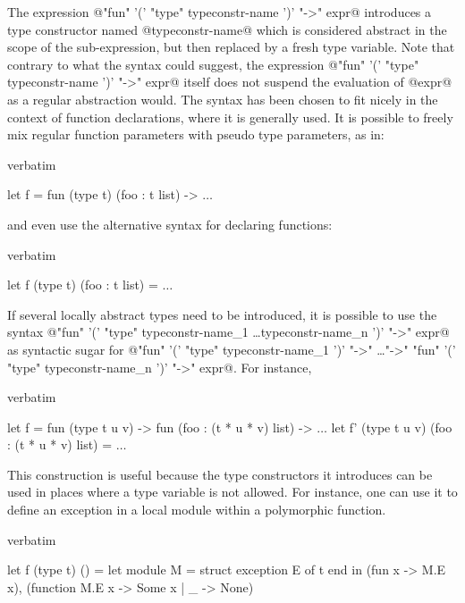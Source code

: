 The expression @"fun" '(' "type" typeconstr-name ')' "->" expr@ introduces a
type constructor named @typeconstr-name@ which is considered abstract
in the scope of the sub-expression, but then replaced by a fresh type
variable.  Note that contrary to what the syntax could suggest, the
expression @"fun" '(' "type" typeconstr-name ')' "->" expr@ itself does not
suspend the evaluation of @expr@ as a regular abstraction would.  The
syntax has been chosen to fit nicely in the context of function
declarations, where it is generally used. It is possible to freely mix
regular function parameters with pseudo type parameters, as in:
\begin{camlexample}{verbatim}
\begin{caml}
\begin{camlinput}
let f = fun (type t) (foo : t list) -> $\ldots$
\end{camlinput}
\end{caml}
\end{camlexample}
and even use the alternative syntax for declaring functions:
\begin{camlexample}{verbatim}
\begin{caml}
\begin{camlinput}
let f (type t) (foo : t list) = $\ldots$
\end{camlinput}
\end{caml}
\end{camlexample}
If several locally abstract types need to be introduced, it is possible to use
the syntax
@"fun" '(' "type" typeconstr-name_1 \ldots typeconstr-name_n ')' "->" expr@
as syntactic sugar for @"fun" '(' "type" typeconstr-name_1 ')' "->" \ldots "->"
"fun" '(' "type" typeconstr-name_n ')' "->" expr@. For instance,
\begin{camlexample}{verbatim}
\begin{caml}
\begin{camlinput}
let f = fun (type t u v) -> fun (foo : (t * u * v) list) -> $\ldots$
let f' (type t u v) (foo : (t * u * v) list) = $\ldots$
\end{camlinput}
\end{caml}
\end{camlexample}

This construction is useful because the type constructors it introduces
can be used in places where a type variable is not allowed. For
instance, one can use it to define an exception in a local module
within a polymorphic function.
\begin{camlexample}{verbatim}
\begin{caml}
\begin{camlinput}
let f (type t) () =
  let module M = struct exception E of t end in
  (fun x -> M.E x), (function M.E x -> Some x | _ -> None)
\end{camlinput}
\end{caml}
\end{camlexample}

